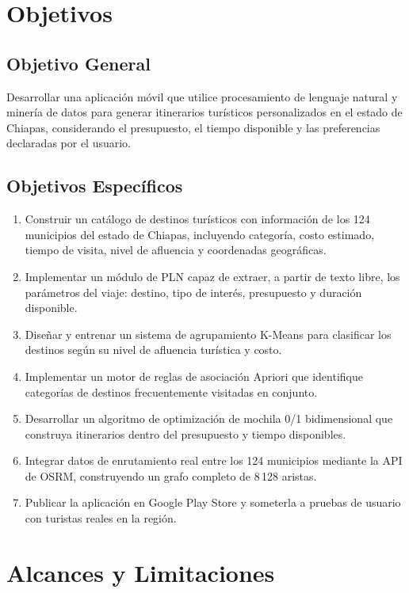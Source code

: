 \documentclass[12pt,letterpaper]{report}
\begin{document}
\section{Objetivos}

\subsection{Objetivo General}

Desarrollar una aplicación móvil que utilice procesamiento de lenguaje natural y minería de
datos para generar itinerarios turísticos personalizados en el estado de Chiapas, considerando
el presupuesto, el tiempo disponible y las preferencias declaradas por el usuario.

\subsection{Objetivos Específicos}

\begin{enumerate}[leftmargin=2cm]
  \item Construir un catálogo de destinos turísticos con información de los 124 municipios del
        estado de Chiapas, incluyendo categoría, costo estimado, tiempo de visita, nivel de
        afluencia y coordenadas geográficas.
  \item Implementar un módulo de PLN capaz de extraer, a partir de texto libre, los parámetros
        del viaje: destino, tipo de interés, presupuesto y duración disponible.
  \item Diseñar y entrenar un sistema de agrupamiento K-Means para clasificar los destinos según
        su nivel de afluencia turística y costo.
  \item Implementar un motor de reglas de asociación Apriori que identifique categorías de
        destinos frecuentemente visitadas en conjunto.
  \item Desarrollar un algoritmo de optimización de mochila 0/1 bidimensional que construya
        itinerarios dentro del presupuesto y tiempo disponibles.
  \item Integrar datos de enrutamiento real entre los 124 municipios mediante la API de OSRM,
        construyendo un grafo completo de 8\,128 aristas.
  \item Publicar la aplicación en Google Play Store y someterla a pruebas de usuario con turistas
        reales en la región.
\end{enumerate}

\section{Alcances y Limitaciones}
\end{document}

